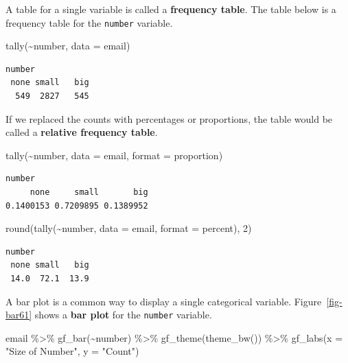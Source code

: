 \documentclass[
  letterpaper,
  DIV=11,
  numbers=noendperiod]{scrreprt}
\newenvironment{Shaded}{\begin{snugshade}}{\end{snugshade}}
\newcommand{\AttributeTok}[1]{\textcolor[rgb]{0.40,0.45,0.13}{#1}}
\newcommand{\DecValTok}[1]{\textcolor[rgb]{0.68,0.00,0.00}{#1}}
\newcommand{\FunctionTok}[1]{\textcolor[rgb]{0.28,0.35,0.67}{#1}}
\newcommand{\NormalTok}[1]{\textcolor[rgb]{0.00,0.23,0.31}{#1}}
\newcommand{\SpecialCharTok}[1]{\textcolor[rgb]{0.37,0.37,0.37}{#1}}
\newcommand{\StringTok}[1]{\textcolor[rgb]{0.13,0.47,0.30}{#1}}
\begin{document}
A table for a single variable is called a \textbf{frequency table}. The
table below is a frequency table for the \texttt{number} variable.

\begin{Shaded}
\begin{Highlighting}[]
\FunctionTok{tally}\NormalTok{(}\SpecialCharTok{\textasciitilde{}}\NormalTok{number, }\AttributeTok{data =}\NormalTok{ email)}
\end{Highlighting}
\end{Shaded}

\begin{verbatim}
number
 none small   big 
  549  2827   545 
\end{verbatim}

If we replaced the counts with percentages or proportions, the table
would be called a \textbf{relative frequency table}.

\begin{Shaded}
\begin{Highlighting}[]
\FunctionTok{tally}\NormalTok{(}\SpecialCharTok{\textasciitilde{}}\NormalTok{number, }\AttributeTok{data =}\NormalTok{ email, }\AttributeTok{format =} \StringTok{\textquotesingle{}proportion\textquotesingle{}}\NormalTok{)}
\end{Highlighting}
\end{Shaded}

\begin{verbatim}
number
     none     small       big 
0.1400153 0.7209895 0.1389952 
\end{verbatim}

\begin{Shaded}
\begin{Highlighting}[]
\FunctionTok{round}\NormalTok{(}\FunctionTok{tally}\NormalTok{(}\SpecialCharTok{\textasciitilde{}}\NormalTok{number, }\AttributeTok{data =}\NormalTok{ email, }\AttributeTok{format =} \StringTok{\textquotesingle{}percent\textquotesingle{}}\NormalTok{), }\DecValTok{2}\NormalTok{)}
\end{Highlighting}
\end{Shaded}

\begin{verbatim}
number
 none small   big 
 14.0  72.1  13.9 
\end{verbatim}

A bar plot is a common way to display a single categorical variable.
Figure~\ref{fig-bar61} shows a \textbf{bar plot} for the \texttt{number}
variable.

\begin{Shaded}
\begin{Highlighting}[]
\NormalTok{email }\SpecialCharTok{\%\textgreater{}\%}
  \FunctionTok{gf\_bar}\NormalTok{(}\SpecialCharTok{\textasciitilde{}}\NormalTok{number) }\SpecialCharTok{\%\textgreater{}\%}
  \FunctionTok{gf\_theme}\NormalTok{(}\FunctionTok{theme\_bw}\NormalTok{()) }\SpecialCharTok{\%\textgreater{}\%}
  \FunctionTok{gf\_labs}\NormalTok{(}\AttributeTok{x =} \StringTok{"Size of Number"}\NormalTok{, }\AttributeTok{y =} \StringTok{"Count"}\NormalTok{)}
\end{Highlighting}
\end{Shaded}
\end{document}
